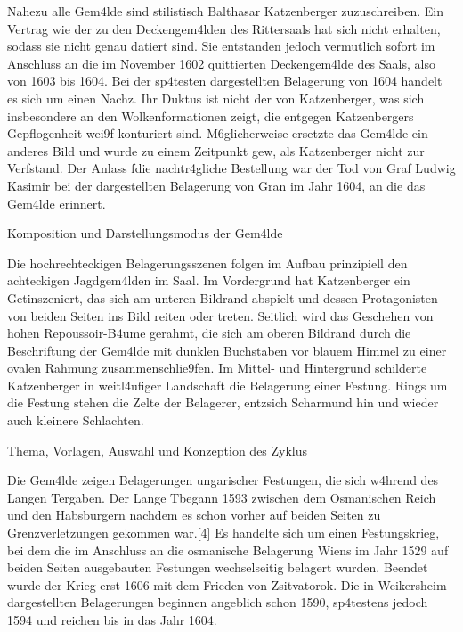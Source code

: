 \documentclass[
  a4paper,
  portrait]{book}
\begin{document}
Nahezu alle Gem\xa4lde sind stilistisch Balthasar Katzenberger
zuzuschreiben. Ein Vertrag wie der zu den Deckengem\xa4lden des
Rittersaals hat sich nicht erhalten, sodass sie nicht genau datiert
sind. Sie entstanden jedoch vermutlich sofort im Anschluss an die im
November 1602 quittierten Deckengem\xa4lde des Saals, also von 1603
bis 1604. Bei der sp\xa4testen dargestellten Belagerung von 1604
handelt es sich um einen Nachz\xbcgler. Ihr Duktus ist nicht der von
Katzenberger, was sich insbesondere an den Wolkenformationen zeigt, die
entgegen Katzenbergers Gepflogenheit wei\x9f konturiert sind.
M\xb6glicherweise ersetzte das Gem\xa4lde ein anderes Bild und
wurde zu einem Zeitpunkt gew\xbcnscht, als Katzenberger nicht zur
Verf\xbcgung stand. Der Anlass f\xbcr die nachtr\xa4gliche
Bestellung war der Tod von Graf Ludwig Kasimir bei der dargestellten
Belagerung von Gran im Jahr 1604, an die das Gem\xa4lde erinnert.

Komposition und Darstellungsmodus der Gem\xa4lde

Die hochrechteckigen Belagerungsszenen folgen im Aufbau prinzipiell den
achteckigen Jagdgem\xa4lden im Saal. Im Vordergrund hat Katzenberger
ein Get\xbcmmel inszeniert, das sich am unteren Bildrand abspielt
und dessen Protagonisten von beiden Seiten ins Bild reiten oder treten.
Seitlich wird das Geschehen von hohen Repoussoir-B\xa4ume gerahmt,
die sich am oberen Bildrand durch die Beschriftung der Gem\xa4lde
mit dunklen Buchstaben vor blauem Himmel zu einer ovalen Rahmung
zusammenschlie\x9fen. Im Mittel- und Hintergrund schilderte
Katzenberger in weitl\xa4ufiger Landschaft die Belagerung einer
Festung. Rings um die Festung stehen die Zelte der Belagerer,
entz\xbcnden sich Scharm\xbctzel und hin und wieder auch
kleinere Schlachten.

Thema, Vorlagen, Auswahl und Konzeption des Zyklus

Die Gem\xa4lde zeigen Belagerungen ungarischer Festungen, die sich
w\xa4hrend des Langen T\xbcrkenkriegs ergaben. Der Lange
T\xbcrkenkrieg begann 1593 zwischen dem Osmanischen Reich und den
Habsburgern nachdem es schon vorher auf beiden Seiten zu
Grenzverletzungen gekommen war.{[}4{]} Es handelte sich um einen
Festungskrieg, bei dem die im Anschluss an die osmanische Belagerung
Wiens im Jahr 1529 auf beiden Seiten ausgebauten Festungen wechselseitig
belagert wurden. Beendet wurde der Krieg erst 1606 mit dem Frieden von
Zsitvatorok. Die in Weikersheim dargestellten Belagerungen beginnen
angeblich schon 1590, sp\xa4testens jedoch 1594 und reichen bis in
das Jahr 1604.
\end{document}
